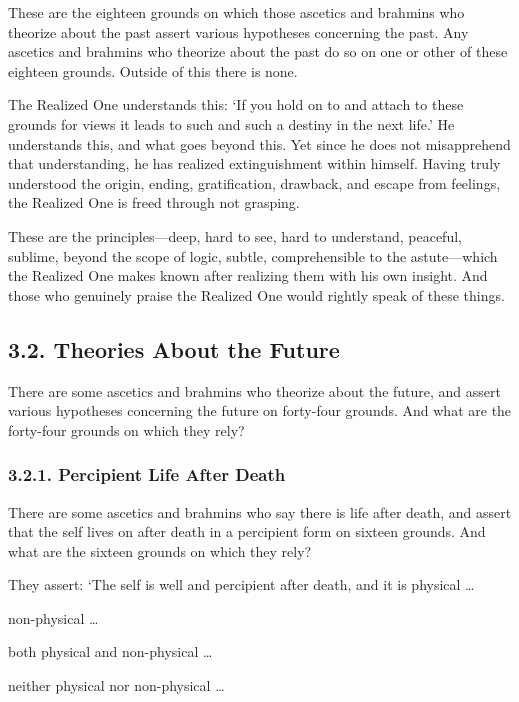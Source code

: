 \documentclass[12pt,openany]{book}%
\begin{document}
These are the eighteen grounds on which those ascetics and brahmins who theorize about the past assert various hypotheses concerning the past. Any ascetics and brahmins who theorize about the past do so on one or other of these eighteen grounds. Outside of this there is none. 

The Realized One understands this: ‘If you hold on to and attach to these grounds for views it leads to such and such a destiny in the next life.’ He understands this, and what goes beyond this. Yet since he does not misapprehend that understanding, he has realized extinguishment within himself. Having truly understood the origin, ending, gratification, drawback, and escape from feelings, the Realized One is freed through not grasping. 

These are the principles—deep, hard to see, hard to understand, peaceful, sublime, beyond the scope of logic, subtle, comprehensible to the astute—which the Realized One makes known after realizing them with his own insight. And those who genuinely praise the Realized One would rightly speak of these things. 

\subsection*{3.2. Theories About the Future }

There are some ascetics and brahmins who theorize about the future, and assert various hypotheses concerning the future on forty-four grounds. And what are the forty-four grounds on which they rely? 

\subsubsection*{3.2.1. Percipient Life After Death }

There are some ascetics and brahmins who say there is life after death, and assert that the self lives on after death in a percipient form on sixteen grounds. And what are the sixteen grounds on which they rely? 

They assert: ‘The self is well and percipient after death, and it is physical … 

non-physical … 

both physical and non-physical … 

neither physical nor non-physical … 
\end{document}

